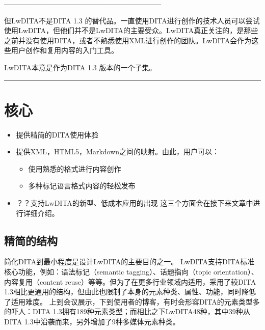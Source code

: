 \documentclass[letterpaper,10pt,english]{sphinxmanual}
\begin{document}
——————————————————————

但LwDITA不是DITA 1.3 的替代品。一直使用DITA进行创作的技术人员可以尝试使用LwDITA，但他们并不是LwDITA的主要受众。LwDITA真正关注的，是那些之前并没有使用DITA，或者不熟悉使用XML进行创作的团队。LwDITA会作为这些用户创作和复用内容的入门工具。

LwDITA本意是作为DITA 1.3 版本的一个子集。


\bigskip\hrule\bigskip



\section{核心}
\label{\detokenize{chap2:id2}}\begin{itemize}
\item {} 
提供精简的DITA使用体验

\item {} 
提供XML，HTML5，Markdown之间的映射。由此，用户可以：
\begin{itemize}
\item {} 
使用熟悉的格式进行内容创作

\item {} 
多种标记语言格式内容的轻松发布

\end{itemize}

\item {} 
？？支持LwDITA的新型、低成本应用的出现
这三个方面会在接下来文章中进行详细介绍。

\end{itemize}


\subsection{精简的结构}
\label{\detokenize{chap2:id3}}
简化DITA到最小程度是设计LwDITA的主要目的之一。
LwDITA支持DITA标准核心功能，例如：语法标记（semantic tagging）、话题指向（topic orientation）、内容复用（content reuse）等等。但为了在更多行业领域内适用，采用了较DITA 1.3相比更通用的结构，但由此也限制了本身的元素种类、属性、功能，同时降低了适用难度。
上到会议展示，下到使用者的博客，有时会形容DITA的元素类型多的吓人：DITA 1.3拥有189种元素类型；而相比之下LwDITA48种，其中39种从DITA 1.3中沿袭而来，另外增加了9种多媒体元素种类。
\end{document}
